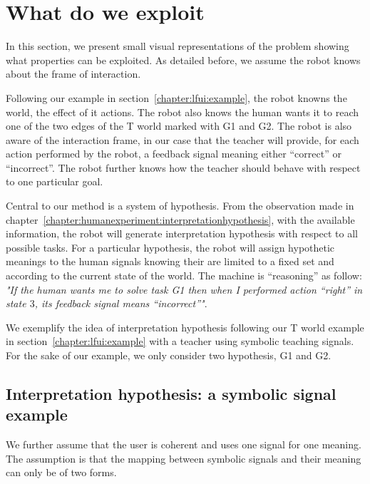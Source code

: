 \section{What do we exploit}

In this section, we present small visual representations of the problem showing what properties can be exploited. As detailed before, we assume the robot knows about the frame of interaction. 

Following our example in section~\ref{chapter:lfui:example}, the robot knowns the world, the effect of it actions. The robot also knows the human wants it to reach one of the two edges of the T world marked with G1 and G2. The robot is also aware of the interaction frame, in our case that the teacher will provide, for each action performed by the robot, a feedback signal meaning either ``correct'' or ``incorrect''. The robot further knows how the teacher should behave with respect to one particular goal.

Central to our method is a system of hypothesis. From the observation made in chapter~\ref{chapter:humanexperiment:interpretationhypothesis}, with the available information, the robot will generate interpretation hypothesis with respect to all possible tasks. For a particular hypothesis, the robot will assign hypothetic meanings to the human signals knowing their are limited to a fixed set and according to the current state of the world. The machine is ``reasoning'' as follow: \emph{"If the human wants me to solve task G1 then when I performed action ``right'' in state $3$, its feedback signal means ``incorrect''"}. 

We exemplify the idea of interpretation hypothesis following our T world example in section~\ref{chapter:lfui:example} with a teacher using symbolic teaching signals. For the sake of our example, we only consider two hypothesis, G1 and G2.


\subsection{Interpretation hypothesis: a symbolic signal example}

We further assume that the user is coherent and uses one signal for one meaning. The assumption is that the mapping between symbolic signals and their meaning can only be of two forms.

